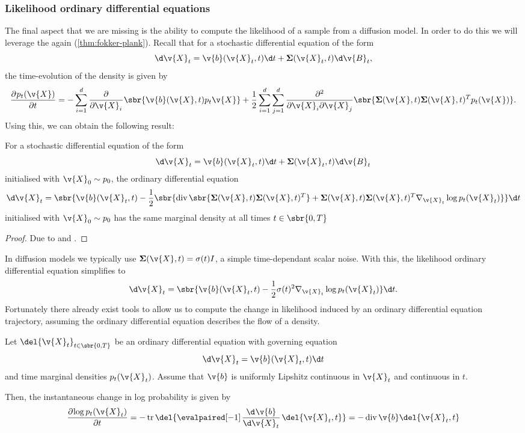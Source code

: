 \subsubsection{Likelihood ordinary differential equations}
\label{sec:likelihood-ode}
The final aspect that we are missing is the ability to compute the likelihood of a sample from a diffusion model.
In order to do this we will leverage the  again (\cref{thm:fokker-plank}).
Recall that for a stochastic differential equation of the form \[\d \v{X}_t = \v{b}(\v{X}_t, t) \d t + \m{\Sigma}(\v{X}_t, t) \d \v{B}_t ,\] the time-evolution of the density is given by
\[ \pd{p_t(\v{X})}{t} = -\sum_{i=1}^d \pd{}{\v{X}_i}\sbr{\v{b}(\v{X}, t) p_t{\v{X}}} + \frac{1}{2} \sum_{i=1}^d \sum_{j=1}^d \frac{\partial^2}{\partial \v{X}_i \partial \v{X}_j} \sbr{\m{\Sigma}(\v{X}, t) \m{\Sigma}(\v{X}, t)^T p_t(\v{X})} .\]
Using this, we can obtain the following result:
\begin{theorem}
	\label{thm:likelihood_ode}
	For a stochastic differential equation of the form 
	\[\d \v{X}_t = \v{b}(\v{X}_t, t) \d t + \m{\Sigma}(\v{X}_t, t) \d \v{B}_t \]
	initialised with \(\v{X}_0 \sim p_0\), the ordinary differential equation
	\[\d \v{X}_t = \sbr{\v{b}(\v{X}_t, t) - \frac{1}{2}\sbr{\dive \sbr{\m{\Sigma}(\v{X}, t) \m{\Sigma}(\v{X}, t)^T}\nonumber +\m{\Sigma}(\v{X}, t) \m{\Sigma}(\v{X}, t)^T \nabla_{\v{X}_t}\log p_t(\v{X}_t)}} \d t\]
	initialised with \(\v{X}_0 \sim p_0\) has the same marginal density at all times \(t\in\sbr{0,T}\)
\end{theorem}
\begin{proof}
	Due to \textcite{maoutsa2020interacting} and \textcite[appendix D]{song2020score}.
\end{proof}
In diffusion models we typically use \(\m{\Sigma}(\v{X}, t) = \sigma(t) I\), a simple time-dependant scalar noise.
With this, the likelihood ordinary differential equation simplifies to
\[\d \v{X}_t = \sbr{\v{b}(\v{X}_t, t) - \frac{1}{2}\sigma(t)^2 \nabla_{\v{X}_t}\log p_t(\v{X}_t)} \d t \label{eq:likelihood_ode_drift} .\]
Fortunately there already exist tools to allow us to compute the change in likelihood induced by an ordinary differential equation trajectory, assuming the ordinary differential equation describes the flow of a density.
\begin{theorem}
	Let \(\del{\v{X}_t}_{t\in\sbr{0,T}}\) be an ordinary differential equation with governing equation
	\[ \d \v{X}_t = \v{b}(\v{X}_t, t) \d t\]
	and time marginal densities \(p_t(\v{X}_t)\).
	Assume that \(\v{b}\) is uniformly Lipshitz continuous in \(\v{X}_t\) and continuous in \(t\).

	Then, the instantaneous change in log probability is given by 
	\[\pd{\log p_t(\v{X}_t)}{t} = -\tr\del{\eval{\od{\v{b}}{\v{X}_t}}{\del{\v{X}_t, t}}} = -\dive \v{b}\del{\v{X}_t, t}\]
\end{theorem}
